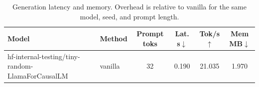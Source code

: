 \begin{table}[t]
\centering
\caption{Generation latency and memory. Overhead is relative to vanilla for the same model, seed, and prompt length.}
\label{tab:efficiency}
\small
\begin{tabular}{llcccc}
\toprule
Model & Method & Prompt toks & Lat. s$\downarrow$ & Tok/s$\uparrow$ & Mem MB$\downarrow$ \\
\midrule
hf-internal-testing/tiny-random-LlamaForCausalLM & vanilla & 32 & 0.190 & 21.035 & 1.970 \\
\bottomrule
\end{tabular}
\end{table}
